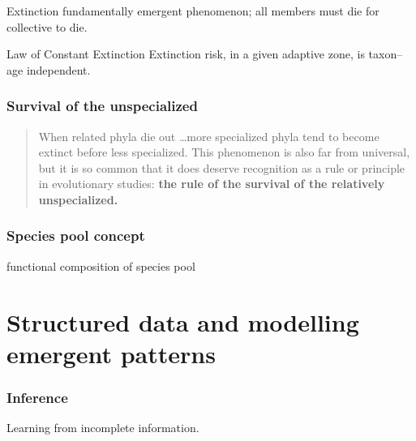 \documentclass{beamer}
\begin{document}
\begin{frame}
  \begin{block}{Extinction}
    fundamentally emergent phenomenon; all members must die for collective to die.
  \end{block}
\end{frame}

\begin{frame}
  \begin{alertblock}{Law of Constant Extinction}
    Extinction risk, in a given adaptive zone, is taxon--age independent.
  \end{alertblock}

  \small{}
\end{frame}

\begin{frame}
  \frametitle{Survival of the unspecialized}
  \begin{quote}
    When related phyla die out \dots more specialized phyla tend to become extinct before less specialized. This phenomenon is also far from universal, but it is so common that it does deserve recognition as a rule or principle in evolutionary studies: \textbf{the rule of the survival of the relatively unspecialized.}

    \small{}
  \end{quote}
\end{frame}


\begin{frame}
  \frametitle{Species pool concept}

  \begin{center}
  \end{center}

\end{frame}

\begin{frame}
  functional composition of species pool
\end{frame}



\section{Structured data and modelling emergent patterns}

\begin{frame}
  \frametitle{Inference}

  Learning from incomplete information.
\end{frame}
\end{document}
